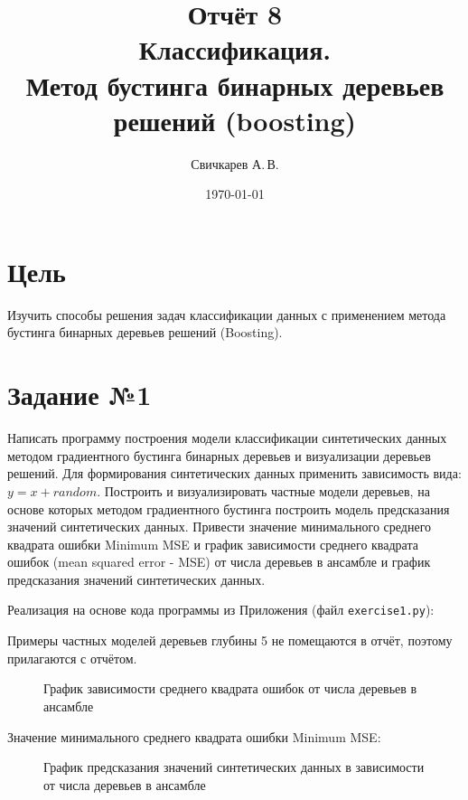 \documentclass{article} %
\title{Отчёт 8\protect\\
    Классификация.\\
    Метод бустинга бинарных деревьев решений (boosting)} %
\author{Свичкарев А.\,В.} %
\date{\today} %
\begin{document}

\maketitle %

\section{Цель}
Изучить способы решения задач классификации данных с
применением метода бустинга бинарных деревьев решений (Boosting).

\section{Задание №1}
Написать программу построения модели классификации синтетических данных
методом градиентного бустинга бинарных деревьев и визуализации деревьев решений.
Для формирования синтетических данных применить зависимость вида: $y = x + random$.
Построить и визуализировать частные модели деревьев, на основе которых методом
градиентного бустинга построить модель предсказания значений синтетических данных.
Привести значение минимального среднего квадрата ошибки Minimum MSE и график
зависимости среднего квадрата ошибок (mean squared error - MSE) от числа деревьев в
ансамбле и график предсказания значений синтетических данных.
\bigskip

Реализация на основе кода программы из Приложения (файл \verb$exercise1.py$):
\bigskip

\clearpage
Примеры частных моделей деревьев глубины 5 не помещаются в отчёт,
поэтому прилагаются с отчётом.

\begin{figure}[H]
    \centering
    \noindent{}
    \caption{График зависимости среднего квадрата ошибок от числа деревьев в ансамбле}
\end{figure}
\bigskip

Значение минимального среднего квадрата ошибки Minimum MSE:


\begin{figure}[H]
    \centering
    \noindent{}
    \caption{График предсказания значений синтетических данных в зависимости от числа деревьев в ансамбле}
\end{figure}
\bigskip
\end{document}
